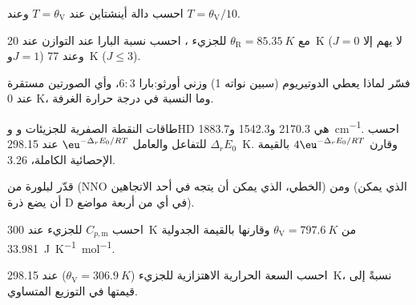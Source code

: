 \begin{exercise}[$\star$]\label{exo:b3:statistical-thermo-applied:2}
احسب دالة أينشتاين عند $T = \theta_{\mathrm V}$ وعند $T = \theta_{\mathrm V}/10$.
\end{exercise}

\begin{exercise}[$\star$]\label{exo:b3:statistical-thermo-applied:3}
مع $\theta_{\mathrm R} = \qty{85.35}{K}$ للجزيء ، احسب نسبة البارا عند التوازن عند
\qty{20}{K} (لا يهم إلا $J = 0$ و$J = 1$) وعند \qty{77}{K} ($J \le 3$).
\end{exercise}

\begin{exercise}[$\star$]\label{exo:b3:statistical-thermo-applied:4}
فسّر لماذا يعطي الدوتيريوم (سبين نواته 1) وزني أورثو:بارا $6 : 3$، وأي
الصورتين مستقرة عند 0 K، وما النسبة في درجة حرارة الغرفة.
\end{exercise}

\begin{exercise}[$\star\star$]\label{exo:b3:statistical-thermo-applied:5}
طاقات النقطة الصفرية للجزيئات  و وHD هي 2170.3 و1542.3 
و\qty{1883.7}{cm^{-1}}. احسب $\Delta_rE_0$ للتفاعل  والعامل $\eu^{-\Delta_rE_0/RT}$ عند
\qty{298.15}{K}. وقارن $4\eu^{-\Delta_rE_0/RT}$ بالقيمة الإحصائية الكاملة، 3.26.
\end{exercise}

\begin{exercise}[$\star\star$]\label{exo:b3:statistical-thermo-applied:6}
قدّر  لبلورة من  (NNO الخطي، الذي يمكن أن
يتجه في أحد الاتجاهين) ومن  (الذي يمكن أن يضع ذرة D في أي من أربعة
مواضع).
\end{exercise}

\begin{exercise}[$\star\star$]\label{exo:b3:statistical-thermo-applied:7}
احسب $C_{p,\mathrm m}$ للجزيء  عند \qty{300}{K} من $\theta_{\mathrm V} = \qty{797.6}{K}$ وقارنها بالقيمة
الجدولية \qty{33.981}{J.K^{-1}.mol^{-1}}.
\end{exercise}

\begin{exercise}[$\star\star$]\label{exo:b3:statistical-thermo-applied:8}
احسب السعة الحرارية الاهتزازية للجزيء  ($\theta_{\mathrm V} = \qty{306.9}{K}$) عند
\qty{298.15}{K}، نسبةً إلى قيمتها في التوزيع المتساوي.
\end{exercise}

